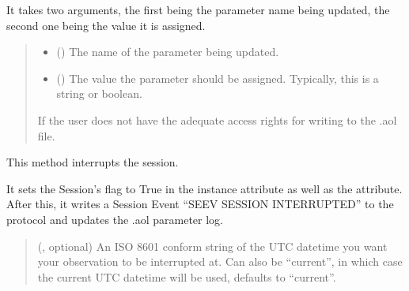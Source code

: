 \documentclass[letterpaper,10pt,english]{sphinxmanual}
\begin{document}
\begin{fulllineitems}
\begin{fulllineitems}
\sphinxAtStartPar
It takes two arguments, the first being the parameter name being updated,
the second one being the value it is assigned.
\begin{quote}\begin{description}
\begin{itemize}
\item {} 
\sphinxAtStartPar
{} () \textendash{} The name of the parameter being updated.

\item {} 
\sphinxAtStartPar
{} () \textendash{} The value the parameter should be assigned. Typically, this
is a string or boolean.

\end{itemize}

\sphinxAtStartPar
{} \textendash{} If the user does not have the adequate access rights for writing to the .aol file.

\end{description}\end{quote}

\end{fulllineitems}


\begin{fulllineitems}
\label{\detokenize{autoapi/aop/aop/index:aop.aop.Session.interrupt}}
\pysigstartsignatures
{}
\pysigstopsignatures
\sphinxAtStartPar
This method interrupts the session.

\sphinxAtStartPar
It sets the Session’s  flag to True in the instance
attribute as well as the  attribute. After this, it writes a
Session Event “SEEV SESSION INTERRUPTED” to the protocol and updates
the .aol parameter log.
\begin{quote}\begin{description}
\sphinxAtStartPar
{} (, optional) \textendash{} An ISO 8601 conform string of the UTC datetime you want your
observation to be interrupted at. Can also be “current”, in which case
the current UTC datetime will be used, defaults to “current”.


\end{description}
\end{quote}
\end{fulllineitems}
\end{fulllineitems}
\end{document}
